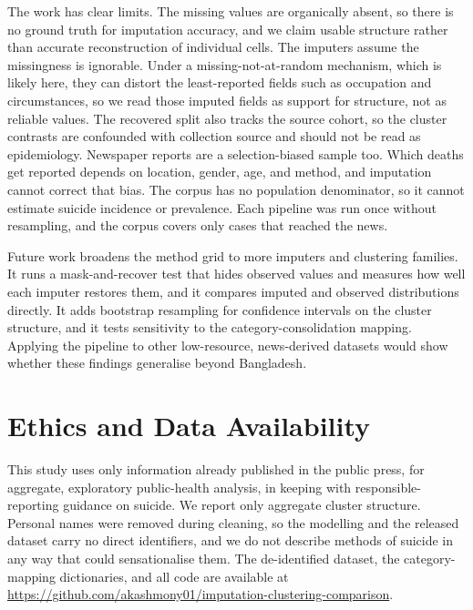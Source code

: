 \documentclass[conference]{IEEEtran}
\begin{document}
The work has clear limits. The missing values are organically absent, so there is no ground truth for imputation accuracy, and we claim usable structure rather than accurate reconstruction of individual cells. The imputers assume the missingness is ignorable. Under a missing-not-at-random mechanism, which is likely here, they can distort the least-reported fields such as occupation and circumstances, so we read those imputed fields as support for structure, not as reliable values. The recovered split also tracks the source cohort, so the cluster contrasts are confounded with collection source and should not be read as epidemiology. Newspaper reports are a selection-biased sample too. Which deaths get reported depends on location, gender, age, and method, and imputation cannot correct that bias. The corpus has no population denominator, so it cannot estimate suicide incidence or prevalence. Each pipeline was run once without resampling, and the corpus covers only cases that reached the news.

Future work broadens the method grid to more imputers and clustering families. It runs a mask-and-recover test that hides observed values and measures how well each imputer restores them, and it compares imputed and observed distributions directly. It adds bootstrap resampling for confidence intervals on the cluster structure, and it tests sensitivity to the category-consolidation mapping. Applying the pipeline to other low-resource, news-derived datasets would show whether these findings generalise beyond Bangladesh.


\section*{Ethics and Data Availability}
This study uses only information already published in the public press, for aggregate, exploratory public-health analysis, in keeping with responsible-reporting guidance on suicide. We report only aggregate cluster structure. Personal names were removed during cleaning, so the modelling and the released dataset carry no direct identifiers, and we do not describe methods of suicide in any way that could sensationalise them. The de-identified dataset, the category-mapping dictionaries, and all code are available at \url{https://github.com/akashmony01/imputation-clustering-comparison}.

\balance


\end{document}
